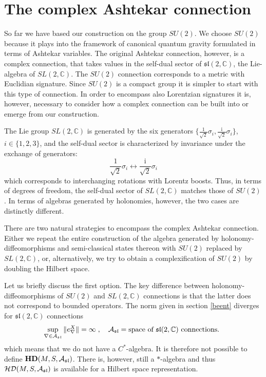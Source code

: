 \documentclass[12pt]{article}
\def\ca{{\cal A}}
\def\cd{{\cal D}}
\def\ch{{\cal H}}
\begin{document}
\section{The complex Ashtekar connection}
\label{REAL}








So far we have based our construction on the group $SU(2)$. We choose $SU(2)$ because it plays into the framework of canonical quantum gravity formulated in terms of Ashtekar variables. The original Ashtekar connection, however, is a complex connection, that takes values in the self-dual sector of $\mathfrak{sl}(2,\mathbb{C})$, the Lie-algebra of $SL(2,\mathbb{C})$. The $SU(2)$ connection corresponds to a metric with Euclidian signature. Since $SU(2)$ is a compact group it is simpler to start with this type of connection. In order to encompass also Lorentzian signatures it is, however, necessary to consider how a complex connection can be built into or emerge from our construction. 

The Lie group $SL(2,\mathbb{C})$ is generated by the six generators $\{\frac{1}{\sqrt{2}}\sigma_i,\frac{\mathrm{i}}{\sqrt{2}}\sigma_i\}$, $i\in\{1,2,3\}$, and the self-dual sector is characterized by invariance under the exchange of generators:
$$
\frac{1}{\sqrt{2}}\sigma_i \longleftrightarrow \frac{\mathrm{i}}{\sqrt{2}}\sigma_i
$$
which corresponds to interchanging rotations with Lorentz boosts. Thus, in terms of degrees of freedom, the self-dual sector of $SL(2,\mathbb{C})$ matches those of $SU(2)$. In terms of algebras generated by holonomies, however, the two cases are distinctly different.


There are two natural strategies to encompass the complex Ashtekar connection. Either we repeat the entire construction of the algebra generated by holonomy-diffeomorphisms and semi-classical states thereon with $SU(2)$ replaced by $SL(2,\mathbb{C})$, or, alternatively, we try to obtain a complexification of $SU(2)$ by doubling the Hilbert space.

Let us briefly discuss the first option.
The key difference between holonomy-diffeomorphisms of $SU(2)$ and $SL(2,\mathbb{C})$ connections is that the latter does not correspond to bounded operators. The norm given in section \ref{beent} diverges for $\mathfrak{sl}(2,\mathbb{C})$ connections
$$
 \sup_{\nabla\in\ca_{\tiny \mathfrak{sl}}} \| e^X_{\nabla}\| =\infty\;,\quad \ca_{\tiny \mathfrak{sl}} = \mbox{space of $\mathfrak{sl}(2,\mathbb{C})$ connections. }
$$
which means that we do not have a $C^*$-algebra. It is therefore not possible to define $\mathbf{HD}(M,S,\ca_{\tiny \mathfrak{sl}})$. There is, however, still a $*$-algebra and thus $\ch\cd(M,S,\ca_{\tiny \mathfrak{sl}})$ is available for a Hilbert space representation.
\end{document}

